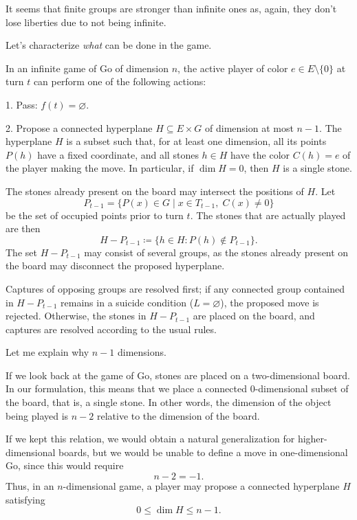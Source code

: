 It seems that finite groups are stronger than infinite ones as, again, they don't lose liberties due to not being infinite.

Let's characterize \textit{what} can be done in the game.

\begin{definition}[A move]
	In an infinite game of Go of dimension $n$, the active player of color $e \in E \setminus \{0\}$ at turn $t$ can perform one of the following actions:

		1. Pass: $f(t) = \varnothing$.
		
		2. Propose a connected hyperplane $H \subseteq E \times G$ of dimension at most
		$n-1$. The hyperplane $H$ is a subset such that,
		for at least one dimension, all its points $P(h)$ have a fixed
		coordinate, and all stones $h \in H$ have the color $C(h) = e$ of the player
		making the move. In particular, if $\dim H=0$, then $H$ is a single stone.
		
		The stones already present on the board may intersect the positions of $H$. Let
		\[
		P_{t-1} = \{P(x) \in G \mid x \in T_{t-1},\; C(x) \neq 0\}
		\]
		be the set of occupied points prior to turn $t$. The stones that are
		actually played are then
		\[
		H - P_{t-1} \coloneqq \{h \in H : P(h) \notin P_{t-1}\}.
		\]
		The set $H - P_{t-1}$ may consist of several groups, as the
		stones already present on the board may disconnect the proposed
		hyperplane.
		
		Captures of opposing groups are resolved first; if any connected group contained in $H - P_{t-1}$ remains in a suicide
		condition ($L = \varnothing$), the proposed move is rejected. Otherwise, the
		stones in $H - P_{t-1}$ are placed on the board, and captures
		are resolved according to the usual rules.

\end{definition}
Let me explain why $n-1$ dimensions.

If we look back at the game of Go, stones are placed on a two-dimensional board. In our formulation, this means that we place a connected $0$-dimensional subset of the board, that is, a single stone. In other words, the dimension of the object being played is $n-2$ relative to the dimension of the board.

If we kept this relation, we would obtain a natural generalization for higher-dimensional boards, but we would be unable to define a move in one-dimensional Go, since this would require
$$ n-2=-1. $$
 Thus, in an $n$-dimensional game, a player may propose a connected hyperplane $H$ satisfying
$$ 0\leq\dim H\leq n-1. $$

